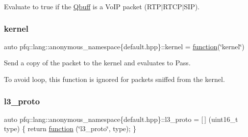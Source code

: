 Evaluate to {\ttfamily true} if the \hyperlink{structpfq_1_1lang_1_1Qbuff}{Qbuff} is a Vo\+IP packet (R\+T\+P$\vert$\+R\+T\+C\+P$\vert$\+S\+IP). 

\mbox{\label{namespacepfq_1_1lang_1_1anonymous__namespace_02default_8hpp_03_a93294225145f96c6aa6cf0cedfa19103}} 
\subsubsection{\texorpdfstring{kernel}{kernel}}
{\footnotesize\ttfamily auto pfq\+::lang\+::anonymous\+\_\+namespace\{default.\+hpp\}\+::kernel = \hyperlink{namespacepfq_1_1lang_a1a4638059d700ae08d0ca63886ff2bb3}{function}(\char`\"{}kernel\char`\"{})}



Send a copy of the packet to the kernel and evaluates to {\ttfamily Pass}. 

To avoid loop, this function is ignored for packets sniffed from the kernel. \mbox{\label{namespacepfq_1_1lang_1_1anonymous__namespace_02default_8hpp_03_a1515f230673119530cd04f213627976f}} 
\subsubsection{\texorpdfstring{l3\+\_\+proto}{l3\_proto}}
{\footnotesize\ttfamily auto pfq\+::lang\+::anonymous\+\_\+namespace\{default.\+hpp\}\+::l3\+\_\+proto = \mbox{[}$\,$\mbox{]} (uint16\+\_\+t type) \{ return \hyperlink{namespacepfq_1_1lang_a1a4638059d700ae08d0ca63886ff2bb3}{function} (\char`\"{}l3\+\_\+proto\char`\"{}, type); \}}



